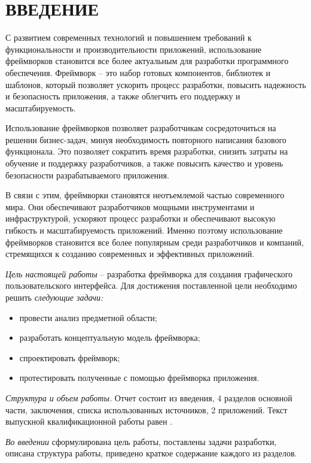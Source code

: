 \section*{ВВЕДЕНИЕ}

С развитием современных технологий и повышением требований к функциональности и производительности приложений, использование фреймворков становится все более актуальным для разработки программного обеспечения. Фреймворк – это набор готовых компонентов, библиотек и шаблонов, который позволяет ускорить процесс разработки, повысить надежность и безопасность приложения, а также облегчить его поддержку и масштабируемость.

Использование фреймворков позволяет разработчикам сосредоточиться на решении бизнес-задач, минуя необходимость повторного написания базового функционала. Это позволяет сократить время разработки, снизить затраты на обучение и поддержку разработчиков, а также повысить качество и уровень безопасности разрабатываемого приложения.

В связи с этим, фреймворки становятся неотъемлемой частью современного мира. Они обеспечивают разработчиков мощными инструментами и инфраструктурой, ускоряют процесс разработки и обеспечивают высокую гибкость и масштабируемость приложений. Именно поэтому использование фреймворков становится все более популярным среди разработчиков и компаний, стремящихся к созданию современных и эффективных приложений.

\emph{Цель настоящей работы} – разработка фреймворка для создания графического пользовательского интерфейса. Для достижения поставленной цели необходимо решить \emph{следующие задачи:}
\begin{itemize}
\item провести анализ предметной области;
\item разработать концептуальную модель фреймворка;
\item спроектировать фреймворк;
\item протестировать полученные с помощью фреймворка приложения.
\end{itemize}

\emph{Структура и объем работы.} Отчет состоит из введения, 4 разделов основной части, заключения, списка использованных источников, 2 приложений. Текст выпускной квалификационной работы равен .

\emph{Во введении} сформулирована цель работы, поставлены задачи разработки, описана структура работы, приведено краткое содержание каждого из разделов.

